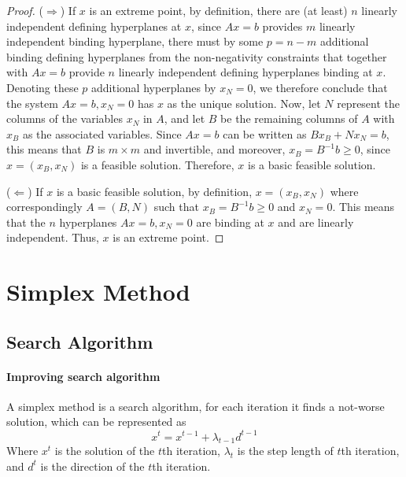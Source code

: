                 \begin{proof}
                    ($\Rightarrow$) If $x$ is an extreme point, by definition, there are (at least) $n$ linearly independent defining hyperplanes at $x$, since $Ax = b$ provides $m$ linearly independent binding hyperplane, there must by some $p = n - m$ additional binding defining hyperplanes from the non-negativity constraints that together with $Ax = b$ provide $n$ linearly independent defining hyperplanes binding at $x$. Denoting these $p$ additional hyperplanes by $x_N = 0$, we therefore conclude that the system $Ax = b, x_N = 0$ has $x$ as the unique solution. Now, let $N$ represent the columns of the variables $x_N$ in $A$, and let $B$ be the remaining columns of $A$ with $x_B$ as the associated variables. Since $Ax = b$ can be written as $Bx_B + Nx_N = b$, this means that $B$ is $m \times m$ and invertible, and moreover, $x_B = B^{-1}b \ge 0$, since $x = (x_B, x_N)$ is a feasible solution. Therefore, $x$ is a basic feasible solution.

                    ($\Leftarrow$) If $x$ is a basic feasible solution, by definition, $x = (x_B, x_N)$ where correspondingly $A = (B, N)$ such that $x_B = B^{-1}b \ge 0$ and $x_N = 0$. This means that the $n$ hyperplanes $Ax = b, x_N = 0$ are binding at $x$ and are linearly independent. Thus, $x$ is an extreme point.
                \end{proof}

    \section{Simplex Method}
        \subsection{Search Algorithm}
            \paragraph{Improving search algorithm}
                A simplex method is a search algorithm, for each iteration it finds a not-worse solution, which can be represented as
                \begin{equation}
                    x^t = x^{t-1}+\lambda_{t-1}d^{t-1} \nonumber 
                \end{equation}
                Where $x^t$ is the solution of the $t$th iteration, $\lambda_t$ is the step length of $t$th iteration, and $d^t$ is the direction of the $t$th iteration.
                    
